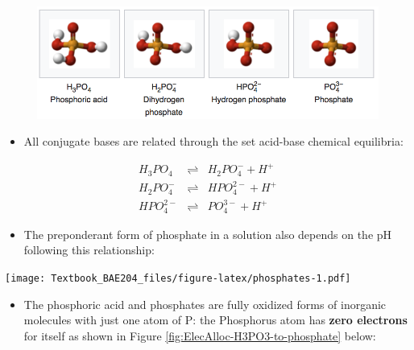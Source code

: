\documentclass[]{book}
\providecommand{\tightlist}{%
  \setlength{\itemsep}{0pt}\setlength{\parskip}{0pt}}
\theoremstyle{definition}
\theoremstyle{definition}
\theoremstyle{definition}
\theoremstyle{remark}
\begin{document}
\begin{figure}
\centering
\includegraphics[width=1.00000\textwidth]{pictures/phosphate_conjugate_bases.png}
\caption{}
\end{figure}

\begin{itemize}
\tightlist
\item
  All conjugate bases are related through the set acid-base chemical
  equilibria:
\end{itemize}

\begin{align}
H_3PO_4  & \rightleftharpoons & H_2PO_4^- + H^+ \tag{$pK_A$ = 2.12}\\
H_2PO_4^- & \rightleftharpoons & HPO_4^{2-} + H^+ \tag{$pK_A$ = 7.21}\\
HPO_4^{2-}& \rightleftharpoons & PO_4^{3-} + H^+ \tag{$pK_A$ = 12.67}
\end{align}

\begin{itemize}
\tightlist
\item
  The preponderant form of phosphate in a solution also depends on the
  pH following this relationship:
\end{itemize}

\texttt{[image: Textbook\_BAE204\_files/figure-latex/phosphates-1.pdf]}

\begin{itemize}
\tightlist
\item
  The phosphoric acid and phosphates are fully oxidized forms of
  inorganic molecules with just one atom of P: the Phosphorus atom has
  \textbf{zero electrons} for itself as shown in Figure
  \ref{fig:ElecAlloc-H3PO3-to-phosphate} below:
\end{itemize}
\end{document}
